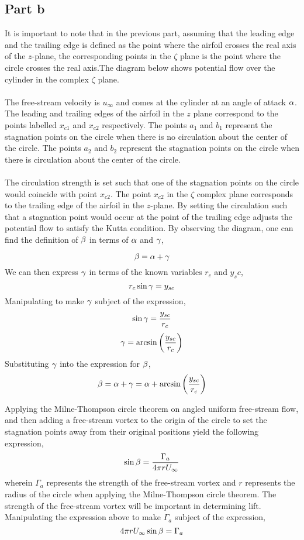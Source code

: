 \documentclass[class=report, 12pt, crop=false]{standalone}
\begin{document}
\begin{center}
\subsection{Part b}
It is important to note that in the previous part, assuming that the leading edge and the trailing edge is defined as the point where the airfoil crosses the real axis of the $z$-plane, the corresponding points in the $\zeta$ plane is the point where the circle crosses the real axis.The diagram below shows potential flow over the cylinder in the complex $\zeta$ plane. 
\\~\\The free-stream velocity is $u_\infty$ and comes at the cylinder at an angle of attack $\alpha$. The leading and trailing edges of the airfoil in the $z$ plane  correspond to the points labelled $x_{c1}$ and $x_{c2}$ respectively. The points $a_1$ and $b_1$ represent the stagnation points on the circle when there is no circulation about the center of the circle. The points $a_2$ and $b_2$ represent the stagnation points on the circle when there is circulation about the center of the circle.
\\~\\The circulation strength is set such that one of the stagnation points on the circle would coincide with point $x_{c2}$. The point $x_{c2}$ in the $\zeta$ complex plane corresponds to the trailing edge of the airfoil in the $z$-plane. By setting the circulation such that a stagnation point would occur at the point of the trailing edge adjusts the potential flow to satisfy the Kutta condition. By observing the diagram, one can find the definition of $\beta$ in terms of $\alpha$ and $\gamma$,

$$\beta = \alpha + \gamma$$
We can then express $\gamma$ in terms of the known variables $r_c$ and $y_sc$,
$$r_c\sin\gamma = y_{sc}$$
Manipulating to make $\gamma$ subject of the expression,
$$\sin\gamma = \frac{y_{sc}}{r_c}$$
$$\gamma = \arcsin\left(\frac{y_{sc}}{r_c}\right)$$
Substituting $\gamma$ into the expression for $\beta$,
$$\beta = \alpha + \gamma = \alpha + \arcsin\left(\frac{y_{sc}}{r_c}\right)$$

Applying the Milne-Thompson circle theorem on angled uniform free-stream flow, and then adding a free-stream vortex to the origin of the circle to set the stagnation points away from their original positions yield the following expression,
$$\sin\beta = \frac{\Gamma_a}{4\pi r U_\infty}$$
wherein $\Gamma_a$ represents the strength of the free-stream vortex and $r$ represents the radius of the circle when applying the Milne-Thompson circle theorem. The strength of the free-stream vortex will be important in determining lift. Manipulating the expression above to make $\Gamma_a$ subject of the expression,
$$4\pi r U_\infty\sin\beta = \Gamma_a$$


\end{center}
\end{document}
